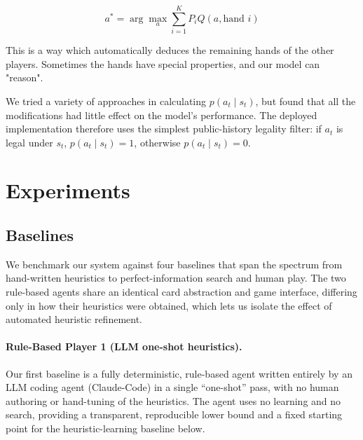 \documentclass{article}
\begin{document}
$$a^* = \arg \max_a \sum_{i=1}^K P_iQ(a,\textrm{hand }i)$$

This is a way which automatically deduces the remaining hands of the other players. Sometimes the hands have special properties, and our model can "reason".

We tried a variety of approaches in calculating $p(a_t\mid s_t)$, but found that all the modifications had little effect on the model's performance. The deployed implementation therefore uses the simplest public-history legality filter: if $a_t$ is legal under $s_t$, $p(a_t\mid s_t)=1$, otherwise $p(a_t\mid s_t)=0$. %


	
\section{Experiments}

\subsection{Baselines}

We benchmark our system against four baselines that span the spectrum from hand-written heuristics to perfect-information search and human play. The two rule-based agents share an identical card abstraction and game interface, differing only in how their heuristics were obtained, which lets us isolate the effect of automated heuristic refinement.

\paragraph{Rule-Based Player 1 (LLM one-shot heuristics).}
Our first baseline is a fully deterministic, rule-based agent written entirely by an LLM coding agent (Claude-Code) in a single ``one-shot'' pass, with no human authoring or hand-tuning of the heuristics. The agent uses no learning and no search, providing a transparent, reproducible lower bound and a fixed starting point for the heuristic-learning baseline below. %
\end{document}
